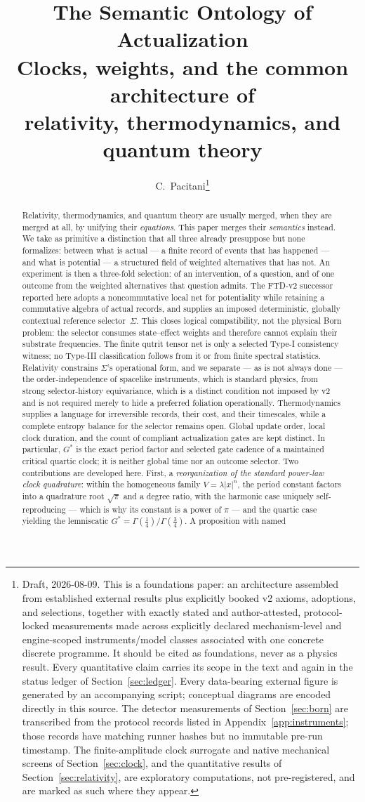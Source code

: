 \documentclass[11pt,a4paper]{article}
\title{\bfseries The Semantic Ontology of Actualization\\[2pt]
\large Clocks, weights, and the common architecture of\\
relativity, thermodynamics, and quantum theory}
\author{C.~Pacitani\thanks{Draft, 2026-08-09. This is a foundations paper:
an architecture assembled from established external results plus explicitly
booked v2 axioms, adoptions, and selections, together with exactly stated and
author-attested, protocol-locked measurements made across explicitly
declared mechanism-level and engine-scoped instruments/model classes
associated with one concrete discrete programme. It
should be cited as foundations, never as a physics result. Every
quantitative claim carries its scope in the text and again in the status
ledger of Section~\ref{sec:ledger}. Every data-bearing external figure is
generated by an accompanying script; conceptual diagrams are encoded
directly in this source. The detector measurements of
Section~\ref{sec:born} are transcribed from the protocol records listed in
Appendix~\ref{app:instruments}; those records have matching runner hashes
but no immutable pre-run timestamp. The finite-amplitude clock surrogate
and native mechanical screens of Section~\ref{sec:clock}, and the
quantitative results of Section~\ref{sec:relativity}, are exploratory
computations, not pre-registered, and are marked as such where they
appear.}}
\date{}
\newcommand{\Gstar}{{G^{*}}}
\theoremstyle{definition}
\theoremstyle{plain}
\theoremstyle{remark}
\begin{document}
\maketitle

\begin{abstract}
Relativity, thermodynamics, and quantum theory are usually merged, when
they are merged at all, by unifying their \emph{equations}. This paper
merges their \emph{semantics} instead. We take as primitive a distinction
that all three already presuppose but none formalizes: between what is
actual --- a finite record of events that has happened --- and what is
potential --- a structured field of weighted alternatives that has not.
An experiment is then a three-fold selection: of an intervention, of a
question, and of one outcome from the weighted alternatives that question
admits. The FTD-v2 successor reported here adopts a noncommutative local net
for potentiality while retaining a commutative algebra of actual records,
and supplies an imposed deterministic, globally contextual reference
selector~$\Sigma$. This closes logical compatibility, not the physical Born
problem: the selector consumes state--effect weights and therefore cannot
explain their substrate frequencies. The finite qutrit tensor net is only a
selected Type-I consistency witness; no Type-III classification follows from
it or from finite spectral statistics. Relativity constrains
$\Sigma$'s operational form, and we separate --- as is not always done ---
the order-independence of spacelike instruments, which is standard
physics, from strong selector-history equivariance, which is a distinct
condition not imposed by v2 and is not required merely to hide a preferred
foliation operationally. Thermodynamics supplies a language for irreversible records,
their cost, and their timescales, while a complete entropy balance for the
selector remains open. Global update order, local clock duration, and the
count of compliant actualization gates are kept distinct. In particular,
$G^*$ is the exact period factor and selected gate cadence of a maintained
critical quartic clock; it is neither global time nor an outcome selector.
Two contributions are developed here. First, a
\emph{reorganization of the standard power-law clock quadrature}: within
the homogeneous family $V=\lambda|x|^n$, the period
constant factors into a quadrature root $\sqrt\pi$ and a degree ratio,
with the harmonic case uniquely
self-reproducing --- which is why its constant is a power of $\pi$ ---
and the quartic case yielding the lemniscatic
$\Gstar=\Gamma(\tfrac14)/\Gamma(\tfrac34)$. A proposition with named

\end{abstract}
\end{document}
